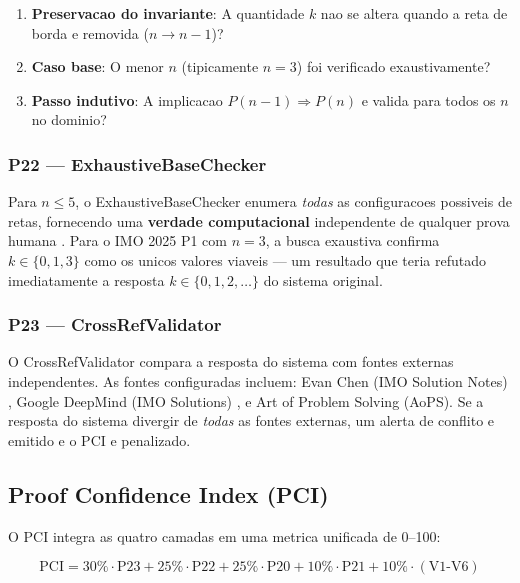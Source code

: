 \documentclass[5p]{elsarticle}
\begin{document}
\begin{enumerate}[label=(\alph*)]
  \item \textbf{Preservacao do invariante}: A quantidade $k$ nao se altera
    quando a reta de borda e removida ($n\to n-1$)?
  \item \textbf{Caso base}: O menor $n$ (tipicamente $n=3$) foi verificado
    exaustivamente?
  \item \textbf{Passo indutivo}: A implicacao $P(n-1)\Rightarrow P(n)$ e
    valida para todos os $n$ no dominio?
\end{enumerate}

\subsubsection{P22 — ExhaustiveBaseChecker}

Para $n\leq 5$, o ExhaustiveBaseChecker enumera \textit{todas} as configuracoes
possiveis de retas, fornecendo uma \textbf{verdade computacional} independente
de qualquer prova humana \cite{clarke1999}. Para o IMO 2025 P1 com $n=3$, a
busca exaustiva confirma $k\in\{0,1,3\}$ como os unicos valores viaveis ---
um resultado que teria refutado imediatamente a resposta $k\in\{0,1,2,\dots\}$
do sistema original.

\subsubsection{P23 — CrossRefValidator}

O CrossRefValidator compara a resposta do sistema com fontes externas
independentes. As fontes configuradas incluem: Evan Chen (IMO Solution Notes)
\cite{chen2025}, Google DeepMind (IMO Solutions) \cite{deepmind2025}, e
Art of Problem Solving (AoPS). Se a resposta do sistema divergir de \textit{todas}
as fontes externas, um alerta de conflito e emitido e o PCI e penalizado.

\subsection{Proof Confidence Index (PCI)}

O PCI integra as quatro camadas em uma metrica unificada de 0--100:

\begin{equation}\label{eq:pci}
  \text{PCI} = 30\%\cdot\text{P23} + 25\%\cdot\text{P22}
  + 25\%\cdot\text{P20} + 10\%\cdot\text{P21}
  + 10\%\cdot(\text{V1-V6})
\end{equation}
\end{document}
